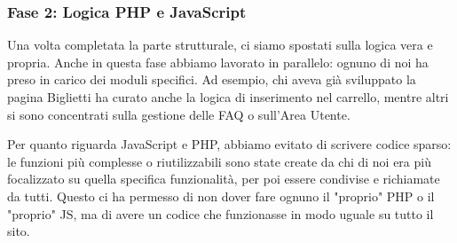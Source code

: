 \documentclass[11pt,a4paper]{article}
\begin{document}
\subsubsection{Fase 2: Logica PHP e JavaScript}
Una volta completata la parte strutturale, ci siamo spostati sulla logica vera e propria. Anche in questa fase abbiamo lavorato in parallelo: ognuno di noi ha preso in carico dei moduli specifici. Ad esempio, chi aveva già sviluppato la pagina Biglietti ha curato anche la logica di inserimento nel carrello, mentre altri si sono concentrati sulla gestione delle FAQ o sull'Area Utente.

Per quanto riguarda JavaScript e PHP, abbiamo evitato di scrivere codice sparso: le funzioni più complesse o riutilizzabili sono state create da chi di noi era più focalizzato su quella specifica funzionalità, per poi essere condivise e richiamate da tutti. Questo ci ha permesso di non dover fare ognuno il "proprio" PHP o il "proprio" JS, ma di avere un codice che funzionasse in modo uguale su tutto il sito.
\end{document}
